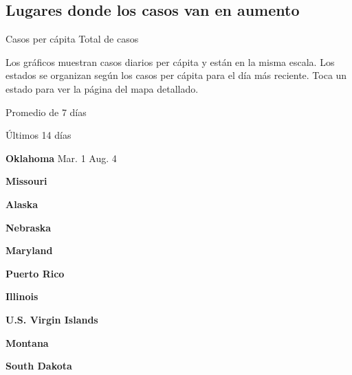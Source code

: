\hypertarget{lugares-donde-los-casos-van-en-aumento}{%
\subsection{Lugares donde los casos van en
aumento}\label{lugares-donde-los-casos-van-en-aumento}}

Casos per cápita Total de casos

Los gráficos muestran casos diarios per cápita y están en la misma
escala. Los estados se organizan según los casos per cápita para el día
más reciente. Toca un estado para ver la página del mapa detallado.

\href{https://www.nytimes.com/interactive/2020/us/oklahoma-coronavirus-cases.html}{}

Promedio de 7 días

Últimos 14 días

\textbf{Oklahoma} Mar. 1 Aug. 4

\href{https://www.nytimes.com/interactive/2020/us/missouri-coronavirus-cases.html}{}

\textbf{Missouri}

\href{https://www.nytimes.com/interactive/2020/us/alaska-coronavirus-cases.html}{}

\textbf{Alaska}

\href{https://www.nytimes.com/interactive/2020/us/nebraska-coronavirus-cases.html}{}

\textbf{Nebraska}

\href{https://www.nytimes.com/interactive/2020/us/maryland-coronavirus-cases.html}{}

\textbf{Maryland}

\href{https://www.nytimes.com/interactive/2020/us/puerto-rico-coronavirus-cases.html}{}

\textbf{Puerto Rico}

\href{https://www.nytimes.com/interactive/2020/us/illinois-coronavirus-cases.html}{}

\textbf{Illinois}

\textbf{U.S. Virgin Islands}

\href{https://www.nytimes.com/interactive/2020/us/montana-coronavirus-cases.html}{}

\textbf{Montana}

\href{https://www.nytimes.com/interactive/2020/us/south-dakota-coronavirus-cases.html}{}

\textbf{South Dakota}

\href{https://www.nytimes.com/interactive/2020/us/rhode-island-coronavirus-cases.html}{}


